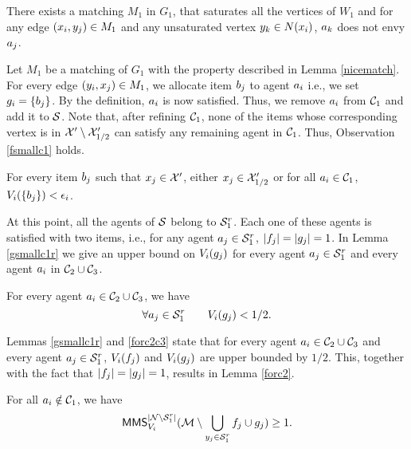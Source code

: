 \begin{lemma}
\label{nicematch}
There exists a matching $M_1$ in $G_1$, that saturates all the vertices of $W_1$ and for any edge $(x_i,y_j) \in M_1$ and any unsaturated vertex $y_k \in N(x_i)$, $a_k$ does not envy $a_j$. 
\end{lemma}


Let $M_1$ be a matching of $G_1$ with the property described in Lemma \ref{nicematch}. For every edge $(y_i,x_j) \in M_1$, we allocate  item $b_j$ to agent $a_i$ i.e., we set $g_i = \{b_j\}$. By the definition, $a_i$ is now satisfied. Thus, we remove $a_i$ from $\mathcal{C}_1$ and add it to $\cal S$. Note that, after refining $\mathcal{C}_1$, none of the items whose corresponding vertex is in $\mathcal{X}' \setminus \mathcal{X}'_{1/2}$ can satisfy any remaining agent in $\mathcal{C}_1$. Thus, Observation \ref{fsmallc1} holds.



\begin{observation}
\label{fsmallc1}
For every item $b_j$ such that $x_j \in \mathcal{X}'$, either $x_j \in \mathcal{X}'_{1/2}$ or for all $a_i \in \mathcal{C}_1$, $V_i(\{b_j\}) < \epsilon_i$.
\end{observation}

At this point, all the agents of $\mathcal{S}$ belong to $\mathcal{S}_1^r$. Each one of these agents is satisfied with two items, i.e., for any agent $a_j \in \mathcal{S}_1^r$, $|f_j| = |g_j| = 1$. In Lemma \ref{gsmallc1r} we give an upper bound on $V_i(g_j)$ for every agent $a_j \in \mathcal{S}_1^r$ and every agent $a_i$ in $\mathcal{C}_2 \cup \mathcal{C}_3$.  

\begin{lemma}
\label{gsmallc1r}
For every agent $a_i \in \mathcal{C}_2 \cup \mathcal{C}_3$, we have
$$ \forall a_j \in \mathcal{S}_1^r \qquad V_i(g_j)< 1/2.$$
\end{lemma}

Lemmas \ref{gsmallc1r} and  \ref{forc2c3}  state that for every agent $a_i \in \mathcal{C}_2 \cup \mathcal{C}_3$  and every agent $a_j \in \mathcal{S}_1^r$, $V_i(f_j)$ and $V_i(g_j)$ are upper bounded by $1/2$. This, together with the fact that $|f_j| = |g_j|=1$, results in Lemma \ref{forc2}.
\begin{lemma}
\label{forc2}
For all $a_i \notin \mathcal{C}_1$, we have
\[ \mathsf{MMS}_{V_i}^{|\mathcal{N} \setminus \mathcal{S}_1^r|} ( {\mathcal{M}} \setminus \bigcup_{y_j \in \mathcal{S}_1^r} f_j \cup g_j) \geq 1.\]
\end{lemma}

